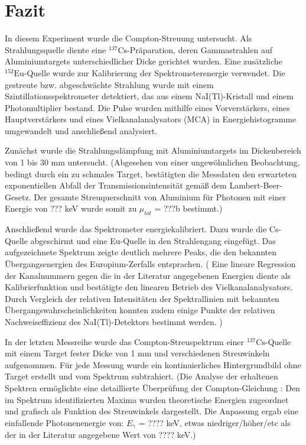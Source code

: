 \section{Fazit}
In diesem Experiment wurde die Compton-Streuung untersucht. Als Strahlungsquelle diente eine $^{137}\text{Cs}$-Präparation, deren Gammastrahlen auf Aluminiumtargets unterschiedlicher Dicke gerichtet wurden. Eine zusätzliche $^{152}\text{Eu}$-Quelle wurde zur Kalibrierung der Spektrometerenergie verwendet. Die gestreute bzw. abgeschwächte Strahlung wurde mit einem Szintillationsspektrometer detektiert, das aus einem NaI(Tl)-Kristall und einem Photomultiplier bestand. Die Pulse wurden mithilfe eines Vorverstärkers, eines Hauptverstärkers und eines Vielkanalanalysators (MCA) in Energiehistogramme umgewandelt und anschließend analysiert.

Zunächst wurde die Strahlungsdämpfung mit Aluminiumtargets im Dickenbereich von 1 bis 30 mm untersucht. 
(Abgesehen von einer ungewöhnlichen Beobachtung, bedingt durch ein zu schmales Target, bestätigten die Messdaten den erwarteten exponentiellen Abfall der Transmissionsintensität gemäß dem Lambert-Beer-Gesetz. Der gesamte Streuquerschnitt von Aluminium für Photonen mit einer Energie von ??? keV wurde somit zu $\mu_{tot}$ = ???b bestimmt.)


Anschließend wurde das Spektrometer energiekalibriert. Dazu wurde die Cs-Quelle abgeschirmt und eine Eu-Quelle in den Strahlengang eingefügt. Das aufgezeichnete Spektrum zeigte deutlich mehrere Peaks, die den bekannten Übergangsenergien des Europium-Zerfalls entsprachen.
( Eine lineare Regression der Kanalnummern gegen die in der Literatur angegebenen Energien diente als Kalibrierfunktion und bestätigte den linearen Betrieb des Vielkanalanalysators. Durch Vergleich der relativen Intensitäten der Spektrallinien mit bekannten Übergangswahrscheinlichkeiten konnten zudem einige Punkte der relativen Nachweiseffizienz des NaI(Tl)-Detektors bestimmt werden. )

In der letzten Messreihe wurde das Compton-Streuspektrum einer $^{137}\text{Cs}$-Quelle mit einem Target fester Dicke von 1 mm und verschiedenen Streuwinkeln aufgenommen. Für jede Messung wurde ein kontinuierliches Hintergrundbild ohne Target erstellt und vom Spektrum subtrahiert. 
(Die Analyse der erhaltenen Spektren ermöglichte eine detaillierte Überprüfung der Compton-Gleichung : Den im Spektrum identifizierten Maxima wurden theoretische Energien zugeordnet und grafisch als Funktion des Streuwinkels dargestellt. Die Anpassung ergab eine einfallende Photonenenergie von: $E_\gamma$ = ???? keV, etwas niedriger/höher/etc als der in der Literatur angegebene Wert von ???? keV.)

